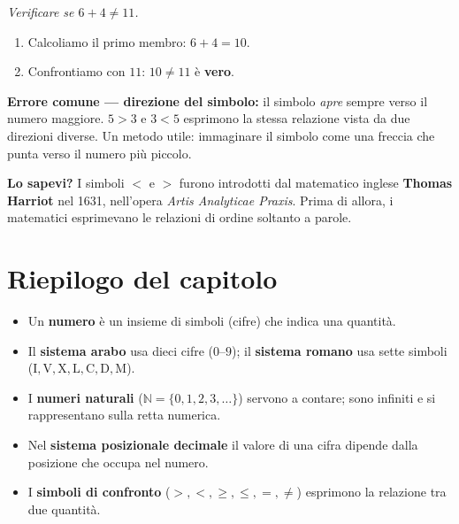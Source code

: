 \begin{esempio}
  \textit{Verificare se $6 + 4 \neq 11$.}

  \begin{enumerate}
    \item Calcoliamo il primo membro: $6 + 4 = 10$.
    \item Confrontiamo con $11$: $10 \neq 11$ è \textbf{vero}.
  \end{enumerate}
\end{esempio}

\begin{attenzione}
  \textbf{Errore comune — direzione del simbolo:}
  il simbolo \emph{apre} sempre verso il numero maggiore.
  $5 > 3$ e $3 < 5$ esprimono la stessa relazione vista da due direzioni diverse.
  Un metodo utile: immaginare il simbolo come una freccia che punta
  verso il numero più piccolo.
\end{attenzione}

\begin{sapevi}
  \textbf{Lo sapevi?}
  I simboli $<$ e $>$ furono introdotti dal matematico inglese
  \textbf{Thomas Harriot} nel 1631, nell'opera \emph{Artis Analyticae Praxis}.
  Prima di allora, i matematici esprimevano le relazioni di ordine
  soltanto a parole.
\end{sapevi}

\section*{Riepilogo del capitolo}

\begin{itemize}
  \item Un \textbf{numero} è un insieme di simboli (cifre) che indica una quantità.
  \item Il \textbf{sistema arabo} usa dieci cifre ($0$–$9$);
        il \textbf{sistema romano} usa sette simboli ($\mathrm{I, V, X, L, C, D, M}$).
  \item I \textbf{numeri naturali} ($\mathbb{N} = \{0, 1, 2, 3, \ldots\}$)
        servono a contare; sono infiniti e si rappresentano sulla retta numerica.
  \item Nel \textbf{sistema posizionale decimale} il valore di una cifra
        dipende dalla posizione che occupa nel numero.
  \item I \textbf{simboli di confronto}
        ($>, <, \geq, \leq, =, \neq$)
        esprimono la relazione tra due quantità.
\end{itemize}
